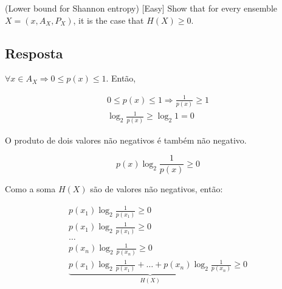 (Lower bound for Shannon entropy) [Easy] Show that for every ensemble $X = \left(x,A_{X},P_{X}\right)$, it is the case that $H(X) \ge 0$.

\subsection*{Resposta}

$\forall x \in A_X \Rightarrow 0 \le p(x) \le 1$. Então,

\[\begin{array}{l}
\displaystyle 0 \le p(x) \le 1 \Rightarrow \frac{1}{{p(x)}} \ge 1\\
\displaystyle {\log _2}\frac{1}{{p(x)}} \ge {\log _2}1 = 0
\end{array}\]

O produto de dois valores não negativos é também não negativo.

\[p(x){\log _2}\frac{1}{{p(x)}} \ge 0\]

Como a soma $H(X)$ são de valores não negativos, então:

\[\begin{array}{l}
p({x_1}){\log _2}\frac{1}{{p({x_1})}} \ge 0\\
p({x_1}){\log _2}\frac{1}{{p({x_1})}} \ge 0\\
 \ldots \\
p({x_n}){\log _2}\frac{1}{{p({x_n})}} \ge 0\\
\underbrace {p({x_1}){{\log }_2}\frac{1}{{p({x_1})}} +  \ldots  + p({x_n}){{\log }_2}\frac{1}{{p({x_n})}}}_{H(X)} \ge 0
\end{array}\]